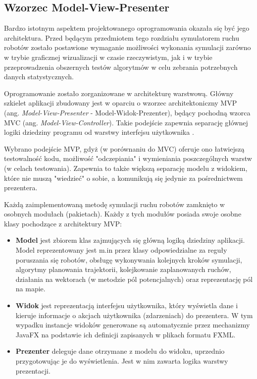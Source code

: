 \subsection{Wzorzec Model-View-Presenter}
\label{ch:app-mvp}
Bardzo istotnym aspektem projektowanego oprogramowania okazała się być jego architektura. Przed będącym przedmiotem tego rozdziału symulatorem ruchu robotów zostało postawione wymaganie możliwości wykonania symulacji zarówno w trybie graficznej wizualizacji w czasie rzeczywistym, jak i w trybie przeprowadzenia obszernych testów algorytmów w celu zebrania potrzebnych danych statystycznych.

Oprogramowanie zostało zorganizowane w architekturę warstwową.
Główny szkielet aplikacji zbudowany jest w oparciu o wzorzec architektoniczny MVP (ang. {\it Model-View-Presenter} - Model-Widok-Prezenter), będący pochodną wzorca MVC (ang. {\it Model-View-Controller}).
Takie podejście zapewnia separację głównej logiki dziedziny programu od warstwy interfejsu użytkownika \cite{mvp}.

Wybrano podejście MVP, gdyż (w porównaniu do MVC) oferuje ono łatwiejszą testowalność kodu, możliwość "odczepiania" i wymieniania poszczególnych warstw (w celach testowania). Zapewnia to także większą separację modelu z widokiem, które nie muszą "wiedzieć" o sobie, a komunikują się jedynie za pośrednictwem prezentera.

Każdą zaimplementowaną metodę symulacji ruchu robotów zamknięto w osobnych modułach (pakietach). Każdy z tych modułów posiada swoje osobne klasy pochodzące z architektury MVP:
\begin{itemize}
	\item {\bf Model} jest zbiorem klas zajmujących się główną logiką dziedziny aplikacji. Model reprezentowany jest m.in przez klasy odpowiedzialne za reguły poruszania się robotów, obsługę wykonywania kolejnych kroków symulacji, algorytmy planowania trajektorii, kolejkowanie zaplanowanych ruchów, działania na wektorach (w metodzie pól potencjalnych) oraz reprezentację pól na mapie.
	\item {\bf Widok} jest reprezentacją interfejsu użytkownika, który wyświetla dane i kieruje informacje o akcjach użytkownika (zdarzeniach) do prezentera. W tym wypadku instancje widoków generowane są automatycznie przez mechanizmy JavaFX na podstawie ich definicji zapisanych w plikach formatu FXML.
	\item {\bf Prezenter} deleguje dane otrzymane z modelu do widoku, uprzednio przygotowując je do wyświetlenia. Jest w nim zawarta logika warstwy prezentacji.
\end{itemize}

